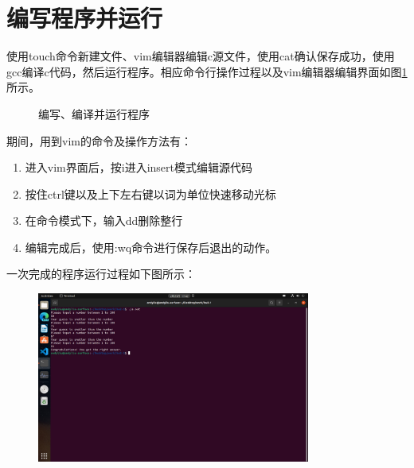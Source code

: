 \documentclass[UTF8]{ctexart}
\begin{document}
    \section{编写程序并运行}
    使用touch命令新建文件、vim编辑器编辑c源文件，使用cat确认保存成功，使用gcc编译c代码，然后运行程序。相应命令行操作过程以及vim编辑器编辑界面如图\ref{programming}所示。
    \begin{figure}[H]
        \centering
        \caption{编写、编译并运行程序}
        \label{programming}
    \end{figure}

    期间，用到vim的命令及操作方法有：
    \begin{enumerate}
        \item 进入vim界面后，按i进入insert模式编辑源代码
        \item 按住ctrl键以及上下左右键以词为单位快速移动光标
        \item 在命令模式下，输入dd删除整行
        \item 编辑完成后，使用:wq命令进行保存后退出的动作。
    \end{enumerate}

    一次完成的程序运行过程如下图所示：
    \begin{figure}[H]
        \centering
        \includegraphics[width=0.8\textwidth]{running.jpg}
    \end{figure}
\end{document}
